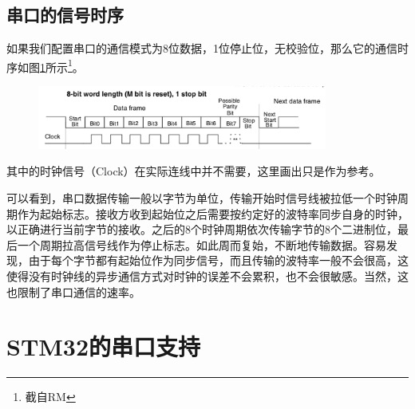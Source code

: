 \subsection{串口的信号时序}
如果我们配置串口的通信模式为8位数据，1位停止位，无校验位，那么它的通信时序如图\ref{fig:usartTime}所示\footnote{截自\acs{RM}}。
\begin{figure}[h]
	\begin{center}
		\includegraphics[width=0.85\textwidth]{images/content/usartTime.png}
		\label{fig:usartTime}
	\end{center}
\end{figure}
\par 
其中的时钟信号（Clock）在实际连线中并不需要，这里画出只是作为参考。
\par 
可以看到，串口数据传输一般以字节为单位，传输开始时信号线被拉低一个时钟周期作为起始标志。接收方收到起始位之后需要按约定好的波特率同步自身的时钟，以正确进行当前字节的接收。之后的8个时钟周期依次传输字节的8个二进制位，最后一个周期拉高信号线作为停止标志。如此周而复始，不断地传输数据。容易发现，由于每个字节都有起始位作为同步信号，而且传输的波特率一般不会很高，这使得没有时钟线的异步通信方式对时钟的误差不会累积，也不会很敏感。当然，这也限制了串口通信的速率。

\section{STM32的串口支持}


















